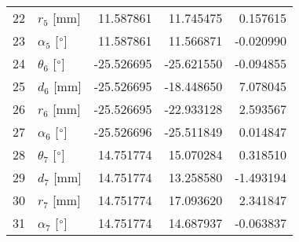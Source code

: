 \documentclass{standalone}%
\begin{document}
\begin{tabular}{llrrr}
22 &              $r_{5}$ [mm] &  11.587861 &  11.745475 &   0.157615 \\
23 &  $\alpha_{5}$ [$\degree$] &  11.587861 &  11.566871 &  -0.020990 \\
24 &  $\theta_{6}$ [$\degree$] & -25.526695 & -25.621550 &  -0.094855 \\
25 &              $d_{6}$ [mm] & -25.526695 & -18.448650 &   7.078045 \\
26 &              $r_{6}$ [mm] & -25.526695 & -22.933128 &   2.593567 \\
27 &  $\alpha_{6}$ [$\degree$] & -25.526696 & -25.511849 &   0.014847 \\
28 &  $\theta_{7}$ [$\degree$] &  14.751774 &  15.070284 &   0.318510 \\
29 &              $d_{7}$ [mm] &  14.751774 &  13.258580 &  -1.493194 \\
30 &              $r_{7}$ [mm] &  14.751774 &  17.093620 &   2.341847 \\
31 &  $\alpha_{7}$ [$\degree$] &  14.751774 &  14.687937 &  -0.063837 \\
\bottomrule
\end{tabular}
%
\end{document}

